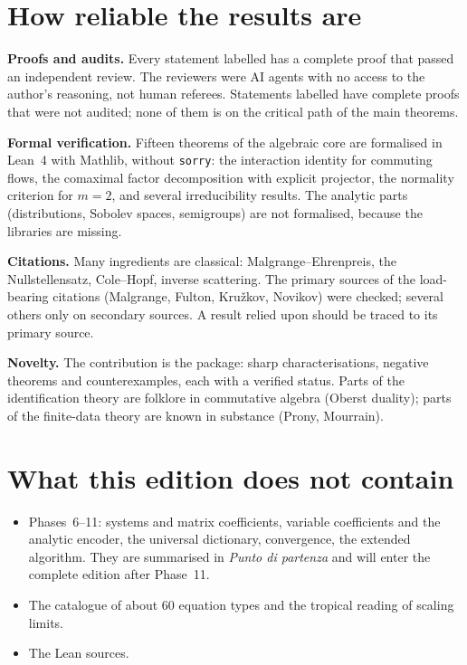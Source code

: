 \section{How reliable the results are}

\textbf{Proofs and audits.} Every statement labelled \proved{} has a complete proof that passed an independent review. The reviewers were AI agents with no access to the author's reasoning, not human referees. Statements labelled \pw{} have complete proofs that were not audited; none of them is on the critical path of the main theorems.

\textbf{Formal verification.} Fifteen theorems of the algebraic core are formalised in Lean~4 with Mathlib, without \texttt{sorry}: the interaction identity for commuting flows, the comaximal factor decomposition with explicit projector, the normality criterion for $m=2$, and several irreducibility results. The analytic parts (distributions, Sobolev spaces, semigroups) are not formalised, because the libraries are missing.

\textbf{Citations.} Many ingredients are classical: Malgrange--Ehrenpreis, the Nullstellensatz, Cole--Hopf, inverse scattering. The primary sources of the load-bearing citations (Malgrange, Fulton, Kru\v zkov, Novikov) were checked; several others only on secondary sources. A result relied upon should be traced to its primary source.

\textbf{Novelty.} The contribution is the package: sharp characterisations, negative theorems and counterexamples, each with a verified status. Parts of the identification theory are folklore in commutative algebra (Oberst duality); parts of the finite-data theory are known in substance (Prony, Mourrain).

\section{What this edition does not contain}

\begin{itemize}
\item Phases~6--11: systems and matrix coefficients, variable coefficients and the analytic encoder, the universal dictionary, convergence, the extended algorithm. They are summarised in \emph{Punto di partenza} and will enter the complete edition after Phase~11.
\item The catalogue of about $60$ equation types and the tropical reading of scaling limits.
\item The Lean sources.
\end{itemize}
